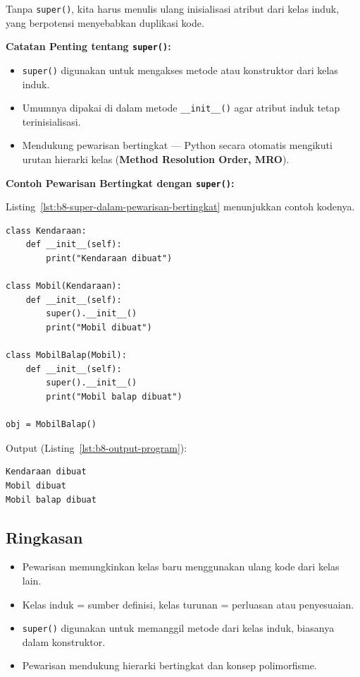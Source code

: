 Tanpa \texttt{super()}, kita harus menulis ulang inisialisasi atribut dari kelas induk, yang berpotensi menyebabkan duplikasi kode.

\textbf{Catatan Penting tentang \texttt{super()}:}
\begin{itemize}
    \item \texttt{super()} digunakan untuk mengakses metode atau konstruktor dari kelas induk.
    \item Umumnya dipakai di dalam metode \texttt{__init__()} agar atribut induk tetap terinisialisasi.
    \item Mendukung pewarisan bertingkat — Python secara otomatis mengikuti urutan hierarki kelas (\textbf{Method Resolution Order, MRO}).
\end{itemize}

\noindent\textbf{Contoh Pewarisan Bertingkat dengan \texttt{super()}:}

Listing~\ref{lst:b8-super-dalam-pewarisan-bertingkat} menunjukkan contoh kodenya.

\begin{lstlisting}[style=PythonStyle, caption={super() dalam Pewarisan Bertingkat}, label={lst:b8-super-dalam-pewarisan-bertingkat}]
class Kendaraan:
    def __init__(self):
        print("Kendaraan dibuat")

class Mobil(Kendaraan):
    def __init__(self):
        super().__init__()
        print("Mobil dibuat")

class MobilBalap(Mobil):
    def __init__(self):
        super().__init__()
        print("Mobil balap dibuat")

obj = MobilBalap()
\end{lstlisting}

Output (Listing~\ref{lst:b8-output-program}):
\begin{lstlisting}[language=bash, caption={Output Program}, label={lst:b8-output-program}]
Kendaraan dibuat
Mobil dibuat
Mobil balap dibuat
\end{lstlisting}

\subsection*{Ringkasan}
\begin{itemize}
    \item Pewarisan memungkinkan kelas baru menggunakan ulang kode dari kelas lain.
    \item Kelas induk = sumber definisi, kelas turunan = perluasan atau penyesuaian.
    \item \texttt{super()} digunakan untuk memanggil metode dari kelas induk, biasanya dalam konstruktor.
    \item Pewarisan mendukung hierarki bertingkat dan konsep polimorfisme.
\end{itemize}


